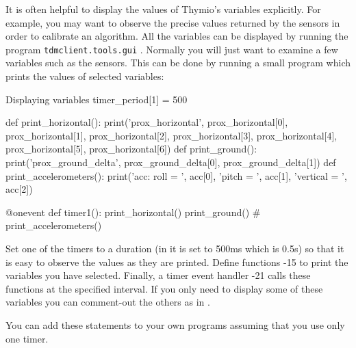 \documentclass[11pt,a4paper]{article}
\newcommand*{\li}[1]{{\footnotesize\textsf{\ddag #1}}}
\begin{document}
It is often helpful to display the values of Thymio's variables explicitly. For example, you may want to observe the precise values returned by the sensors in order to calibrate an algorithm. All the variables can be displayed by running the program \texttt{tdmclient.tools.gui} \cite{tdm}. Normally you will just want to examine a few variables such as the sensors. This can be done by running a small program which prints the values of selected variables:
\begin{progln}{Displaying variables}
timer_period[1] = 500

def print_horizontal():
    print('prox_horizontal',
          prox_horizontal[0], prox_horizontal[1],
          prox_horizontal[2], prox_horizontal[3],
          prox_horizontal[4],
          prox_horizontal[5], prox_horizontal[6])
def print_ground():
    print('prox_ground_delta',
          prox_ground_delta[0], prox_ground_delta[1])
def print_accelerometers():
    print('acc: roll = ', acc[0],
          'pitch = ', acc[1],
          'vertical = ', acc[2])

@onevent
def timer1():
    print_horizontal()
    print_ground()
    # print_accelerometers()
\end{progln}

Set one of the timers to a duration (in \li{1} it is set to 500ms which is 0.5s) so that it is easy to observe the values as they are printed. Define functions \li{3-15} to print the variables you have selected. Finally, a timer event handler \li{17-21} calls these functions at the specified interval. If you only need to display some of these variables you can comment-out the others as in \li{21}.

You can add these statements to your own programs assuming that you use only one timer.



\begin{small}

\end{small}
\end{document}
